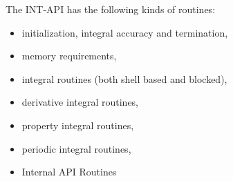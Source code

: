 The INT-API has the following kinds of routines: 
\begin{itemize} 
\item initialization, integral accuracy and termination, 
\item memory requirements, 
\item integral routines (both shell based and blocked), 
\item derivative integral routines, 
\item property integral routines, 
\item periodic integral routines, 
\item Internal API Routines 
\end{itemize} 
 
%  
%  
%  
%  
%  
%  
%  
%  
